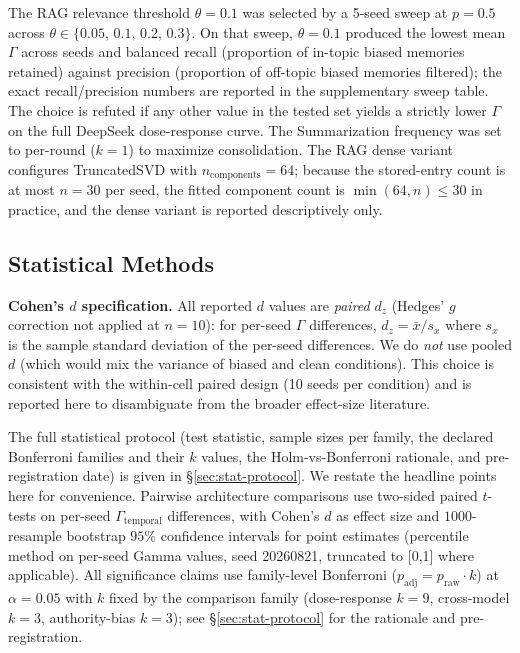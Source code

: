 \documentclass[11pt]{article}
\begin{document}
The RAG relevance threshold $\theta = 0.1$ was selected by a 5-seed sweep at $p=0.5$ across $\theta \in \{0.05,\,0.1,\,0.2,\,0.3\}$. On that sweep, $\theta = 0.1$ produced the lowest mean $\Gamma$ across seeds and balanced recall (proportion of in-topic biased memories retained) against precision (proportion of off-topic biased memories filtered); the exact recall/precision numbers are reported in the supplementary sweep table. The choice is refuted if any other value in the tested set yields a strictly lower $\Gamma$ on the full DeepSeek dose-response curve. The Summarization frequency was set to per-round ($k=1$) to maximize consolidation. The RAG dense variant configures TruncatedSVD with $n_{\text{components}} = 64$; because the stored-entry count is at most $n{=}30$ per seed, the fitted component count is $\min(64, n) \le 30$ in practice, and the dense variant is reported descriptively only.

\subsection{Statistical Methods}

\textbf{Cohen's $d$ specification.} All reported $d$ values are \emph{paired} $d_z$ (Hedges' $g$ correction not applied at $n=10$): for per-seed $\Gamma$ differences, $d_z = \bar{x} / s_x$ where $s_x$ is the sample standard deviation of the per-seed differences. We do \emph{not} use pooled $d$ (which would mix the variance of biased and clean conditions). This choice is consistent with the within-cell paired design (10 seeds per condition) and is reported here to disambiguate from the broader effect-size literature.

The full statistical protocol (test statistic, sample sizes per family, the declared Bonferroni families and their $k$ values, the Holm-vs-Bonferroni rationale, and pre-registration date) is given in \S\ref{sec:stat-protocol}. We restate the headline points here for convenience. Pairwise architecture comparisons use two-sided paired $t$-tests on per-seed $\Gamma_{\text{temporal}}$ differences, with Cohen's $d$ as effect size and $1000$-resample bootstrap $95\%$ confidence intervals for point estimates (percentile method on per-seed Gamma values, seed 20260821, truncated to [0,1] where applicable). All significance claims use family-level Bonferroni ($p_{\text{adj}} = p_{\text{raw}} \cdot k$) at $\alpha = 0.05$ with $k$ fixed by the comparison family (dose-response $k=9$, cross-model $k=3$, authority-bias $k=3$); see \S\ref{sec:stat-protocol} for the rationale and pre-registration.
\end{document}

